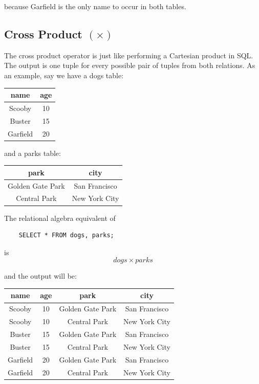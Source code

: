 \documentclass{article}
\begin{document}
because Garfield is the only name to occur in both tables.

\subsection{Cross Product $(\times)$}
The cross product operator is just like performing a Cartesian product in SQL. The output is one tuple for every possible pair of tuples from both relations. As an example, say we have a dogs table:

\begin{center}
\begin{tabular}{|c|c|}
\hline
\textbf{name} & \textbf{age} \\
\hline
Scooby & 10 \\
Buster & 15 \\
Garfield & 20 \\
\hline
\end{tabular}
\end{center}

and a parks table:

\begin{center}
\begin{tabular}{|c|c|}
\hline
\textbf{park} & \textbf{city} \\
\hline
Golden Gate Park & San Francisco \\
Central Park & New York City \\
\hline
\end{tabular}
\end{center}

The relational algebra equivalent of

\begin{lstlisting}
    SELECT * FROM dogs, parks;
\end{lstlisting}
is
\[
    dogs \times parks
\]

and the output will be:

\begin{center}
\begin{tabular}{|c|c|c|c|}
\hline
\textbf{name} & \textbf{age} & \textbf{park} & \textbf{city} \\
\hline
Scooby & 10 & Golden Gate Park & San Francisco \\
Scooby & 10 & Central Park & New York City \\
Buster & 15 & Golden Gate Park & San Francisco \\
Buster & 15 & Central Park & New York City \\
Garfield & 20 & Golden Gate Park & San Francisco \\
Garfield & 20 & Central Park & New York City \\
\hline
\end{tabular}
\end{center}
\end{document}
